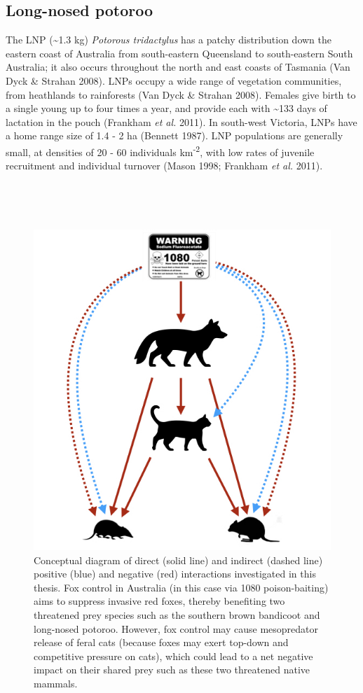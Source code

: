 \documentclass[11pt,a4paper,titlepage,twoside,openright]{style/unimelbthesis}
\begin{document}
\begin{mainmatter}
\hypertarget{long-nosed-potoroo}{%
\subsection{Long-nosed potoroo}\label{long-nosed-potoroo}}

The LNP (\textasciitilde1.3 kg) \emph{Potorous tridactylus} has a patchy distribution down the eastern coast of Australia from south-eastern Queensland to south-eastern South Australia; it also occurs throughout the north and east coasts of Tasmania (Van Dyck \& Strahan 2008). LNPs occupy a wide range of vegetation communities, from heathlands to rainforests (Van Dyck \& Strahan 2008). Females give birth to a single young up to four times a year, and provide each with \textasciitilde133 days of lactation in the pouch (Frankham \emph{et al.} 2011). In south-west Victoria, LNPs have a home range size of 1.4 - 2 ha (Bennett 1987). LNP populations are generally small, at densities of 20 - 60 individuals km\textsuperscript{-2}, with low rates of juvenile recruitment and individual turnover (Mason 1998; Frankham \emph{et al.} 2011).

\newpage

\(~\)

\(~\)
\begin{figure}

{\centering \includegraphics[width=0.7\linewidth]{figure/conceptual_diagram} 

}

\caption{Conceptual diagram of direct (solid line) and indirect (dashed line) positive (blue) and negative (red) interactions investigated in this thesis. Fox control in Australia (in this case via 1080 poison-baiting) aims to suppress invasive red foxes, thereby benefiting two threatened prey species such as the southern brown bandicoot and long-nosed potoroo. However, fox control may cause mesopredator release of feral cats (because foxes may exert top-down and competitive pressure on cats), which could lead to a net negative impact on their shared prey such as these two threatened native mammals.}\label{fig:intro-conceptual}
\end{figure}
\hypertarget{otways17}{%
}
\end{mainmatter}
\end{document}
